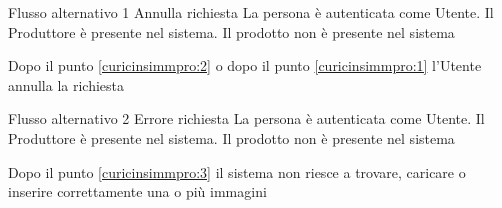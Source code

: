 %
{Flusso alternativo 1}%
{Annulla richiesta}%
{La persona è autenticata come Utente. Il Produttore è presente nel sistema. Il prodotto non è presente nel sistema}%
{\postNulle}%
{\begin{enumCU}
		\item Dopo il punto \ref{curicinsimmpro:2} o dopo il punto \ref{curicinsimmpro:1} l'Utente annulla la richiesta
	\end{enumCU}}%
%
{Flusso alternativo 2}%
{Errore richiesta}%
{La persona è autenticata come Utente. Il Produttore è presente nel sistema. Il prodotto non è presente nel sistema}%
{\postNulle}%
{\begin{enumCU}
		\item Dopo il punto \ref{curicinsimmpro:3} il sistema non riesce a trovare, caricare o inserire correttamente una o più immagini
	\end{enumCU}}%

\tabcuvspace

